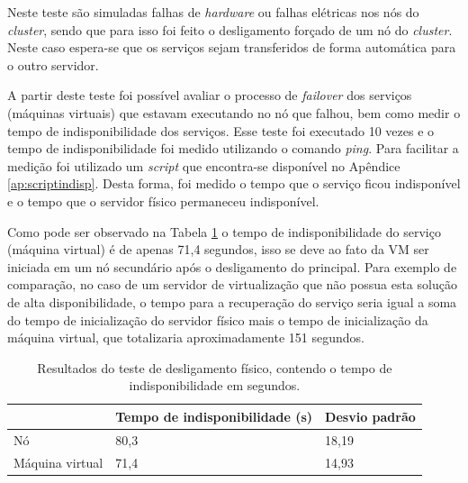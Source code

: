 Neste teste são simuladas falhas de \textit{hardware} ou falhas elétricas nos nós do \textit{cluster}, sendo que para isso foi feito o desligamento 
forçado de um nó do \textit{cluster}. Neste caso espera-se que os serviços sejam transferidos de forma automática para o outro servidor. 

A partir deste teste foi possível avaliar o processo de \textit{failover} dos serviços (máquinas virtuais) que estavam executando no nó que falhou, 
bem como medir o tempo de indisponibilidade dos serviços. Esse teste foi executado 10 vezes e o tempo de indisponibilidade foi medido utilizando o 
comando \textit{ping}. Para facilitar a medição foi utilizado um \textit{script} que encontra-se disponível no Apêndice \ref{ap:scriptindisp}. 
Desta forma, foi medido o tempo que o serviço ficou indisponível e o tempo que o servidor físico permaneceu indisponível.

Como pode ser observado na Tabela \ref{tab:teste1resultados} o tempo de indisponibilidade do serviço (máquina virtual) é de apenas 71,4 segundos, 
isso se deve ao fato da \ac{VM} ser iniciada em um nó secundário após o desligamento do principal. Para exemplo de comparação, no caso de um 
servidor de virtualização que não possua esta solução de alta disponibilidade, o tempo para a recuperação do serviço seria igual a soma do 
tempo de inicialização do servidor físico mais o tempo de inicialização da máquina virtual, que totalizaria aproximadamente 151 segundos. 



\begin{table}[h!]
\caption{Resultados do teste de desligamento físico, contendo o tempo de indisponibilidade em segundos.}
\small
\label{tab:teste1resultados}
\begin{center}
\begin{tabular}{|l|l|l|}\hline
 & \textbf{Tempo de indisponibilidade (s)} & \textbf{Desvio padrão} \\\hline
Nó & 80,3 & 18,19 \\\hline
Máquina virtual & 71,4 & 14,93 \\\hline
\end{tabular}
\end{center}
\end{table}

